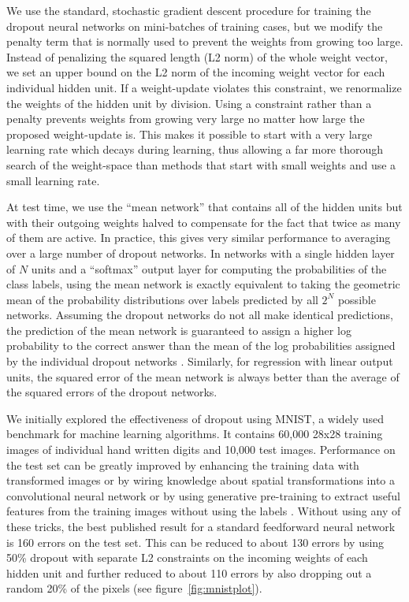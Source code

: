 \documentclass[12pt]{article}
\begin{document}
We use the standard, stochastic gradient descent procedure for training the dropout neural
networks on mini-batches of training cases, but we modify the penalty term that
is normally used to prevent the weights from growing too large. Instead of penalizing the
squared length (L2 norm) of the whole weight vector, we set an upper bound on the L2 norm
of the incoming weight vector for each individual hidden unit. If a weight-update violates
this constraint, we renormalize the weights of the hidden unit by division. Using a
constraint rather than a penalty prevents weights from growing very large no matter how
large the proposed weight-update is. This makes it possible to start with a very large
learning rate which decays during learning, thus allowing a far more thorough search of
the weight-space than methods that start with small weights and use a small learning rate.

At test time, we use the ``mean network'' that contains all of the hidden units but with
their outgoing weights halved to compensate for the fact that twice as many of them are
active.  In practice, this gives very similar performance to averaging over a large number
of dropout networks. In networks with a single hidden layer of $N$ units and a ``softmax''
output layer for computing the probabilities of the class labels, using the mean network
is exactly equivalent to taking the geometric mean of the probability distributions over
labels predicted by all $2^N$ possible networks.  Assuming the dropout networks do not all
make identical predictions, the prediction of the mean network is guaranteed to assign a
higher log probability to the correct answer than the mean of the log probabilities
assigned by the individual dropout networks \cite{HintonCD}.  Similarly, for regression
with linear output units, the squared error of the mean network is always better than the
average of the squared errors of the dropout networks.

We initially explored the effectiveness of dropout using MNIST, a widely used benchmark
for machine learning algorithms. It contains 60,000 28x28 training images of individual
hand written digits and 10,000 test images. Performance on the test set can be greatly
improved by enhancing the training data with transformed images \cite{Ciresan2011} or by
wiring knowledge about spatial transformations into a convolutional neural network
\cite{Lecun} or by using generative pre-training to extract useful features from the
training images without using the labels \cite{Science}. Without using any of these
tricks, the best published result for a standard feedforward neural network is 160 errors
on the test set. This can be reduced to about 130 errors by using 50\% dropout with
separate L2 constraints on the incoming weights of each hidden unit and further reduced to
about 110 errors by also dropping out a random 20\% of the pixels (see figure~\ref{fig:mnistplot}).
\end{document}
